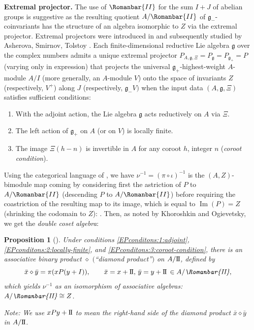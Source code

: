 \documentclass[pdftex]{sigma}
\numberwithin{equation}{section}
\newtheorem{Proposition}[Theorem]{Proposition}
 { \theoremstyle{definition}
\newtheorem{Definition}[Theorem]{Definition}
\newtheorem{Note}[Theorem]{Note}
\newtheorem{Example}[Theorem]{Example}
\newtheorem{Remark}[Theorem]{Remark} }
\newcommand{\II}{\mathrm{I\hspace{-.1em}I}}
\begin{document}
{\bf Extremal projector.} %
The use of $\Romanbar{II}$ for the sum $I+J$ of abelian groups is suggestive as the resulting quotient $A/\Romanbar{II}$ of $\mathfrak{g}_{-}$-coinvariants has the structure of an algebra isomorphic to $Z$ via the extremal projector.
Extremal projectors were introduced in \cite{lowdinAngularMomentumWavefunctions1964} and subsequently studied by Asherova, Smirnov, Tolstoy \cite{asherovaProjectionOperatorsSimple1973}.
Each finite-dimensional reductive Lie algebra $\mathfrak{g}$ over the complex numbers admits a unique extremal projector $P_{A,\mathfrak{g},\Xi} = P_{\mathfrak{g}} = P_{\mathfrak{g}_{+}} = P$ (varying only in expression) that projects the universal $\mathfrak{g}_{+}$-highest-weight $A$-module $A/I$ (more generally, an $A$-module $V$) onto the space of invariants $Z$ (respectively, $V^{+}$) along $J$ (respectively, $\mathfrak{g}_{-}V)$ when the input data $(A,\mathfrak{g},\Xi)$ satisfies sufficient conditions:
\begin{enumerate}[label=(C\arabic*)]\itemsep=0pt
	\item With the adjoint action, the Lie algebra $\mathfrak{g}$ acts reductively on $A$ via $\Xi$. \label{EPconditons:1:adjoint}
	\item The left action of $\mathfrak{g}_{+}$ on $A$ (or on $V$) is locally finite. \label{EPconditons:2:locally-finite}
	\item The image $\Xi(h-n)$ is invertible in $A$ for any coroot $h$, integer $n$ (\emph{coroot condition}). \label{EPconditons:3:coroot-condition}
\end{enumerate}
Using the categorical language of \cite{andreotti1957generalites}, we have $\nu^{-1} = (\pi \circ \iota)^{-1}$ is the $(A,Z)$-bimodule map coming by considering first the astriction of $P$ to $A/\Romanbar{II}$ (descending $P$ to $A/\Romanbar{II}$) before requiring the coastriction of the resulting map to its image, which is equal to $\operatorname{Im}(P) = Z$ (shrinking the codomain to $Z$): . Then, as noted by Khoroshkin and Ogievetsky, we get the \emph{double coset algebra}:

\begin{Proposition}[{\cite[equation (3.7)]{khoroshkinMickelssonAlgebrasZhelobenko2008}}]\label{thm:double-coset-algebra}
	Under conditions {\rm\ref{EPconditons:1:adjoint}}, {\rm\ref{EPconditons:2:locally-finite}}, and {\rm\ref{EPconditons:3:coroot-condition}},
	there is an associative binary product $\diamond$ $($``diamond product''$)$ on $A/\II$, defined by
	\[\bar{x} \diamond \bar{y} = \pi(xP(y+I)), \qquad \bar{x} = x+ \II,\thinspace \bar{y} = y + \II\thinspace \in A/\emph{\Romanbar{II}},\]
	which yields $\nu^{-1}$ as an isomorphism of associative algebras: $A/\emph{\Romanbar{II}} \cong Z$.
	
	Note: We use $xPy + \II$ to mean the right-hand side of the diamond product $\bar{x} \diamond \bar{y}$ in $A/\II$.
\end{Proposition}
\end{document}
